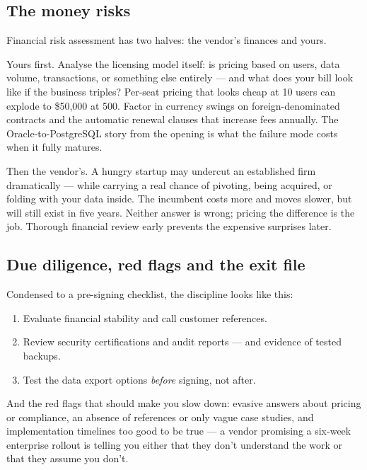 \subsection{The money risks}


Financial risk assessment has two halves: the vendor's finances and yours.


Yours first. Analyse the licensing model itself: is pricing based on users, data volume, transactions, or something else entirely — and what does your bill look like if the business triples? Per-seat pricing that looks cheap at 10 users can explode to \$50,000 at 500. Factor in currency swings on foreign-denominated contracts and the automatic renewal clauses that increase fees annually. The Oracle-to-PostgreSQL story from the opening is what the failure mode costs when it fully matures.


Then the vendor's. A hungry startup may undercut an established firm dramatically — while carrying a real chance of pivoting, being acquired, or folding with your data inside. The incumbent costs more and moves slower, but will still exist in five years. Neither answer is wrong; pricing the difference is the job. Thorough financial review early prevents the expensive surprises later.



\subsection{Due diligence, red flags and the exit file}


Condensed to a pre-signing checklist, the discipline looks like this:


\begin{enumerate}[leftmargin=*]
\item Evaluate financial stability and call customer references.
\item Review security certifications and audit reports — and evidence of tested backups.
\item Test the data export options \emph{before} signing, not after.
\end{enumerate}

And the red flags that should make you slow down: evasive answers about pricing or compliance, an absence of references or only vague case studies, and implementation timelines too good to be true — a vendor promising a six-week enterprise rollout is telling you either that they don't understand the work or that they assume you don't.


